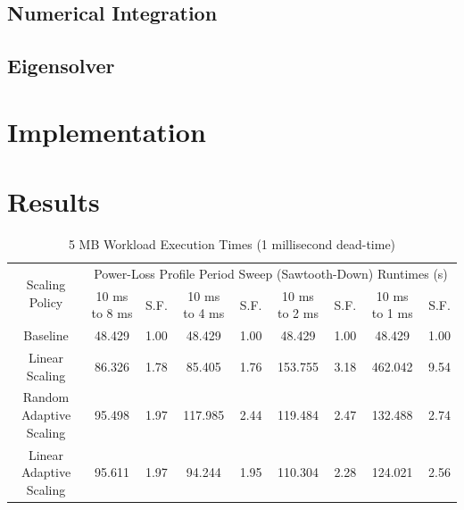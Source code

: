 \documentclass[journal, twoside]{IEEEtran}
\begin{document}
\subsection{Numerical Integration}

\lipsum[4]

\subsection{Eigensolver}

\lipsum[4]

\section{Implementation}

\lipsum[2]

\section{Results}

\lipsum[4]


\begin{table}
    \renewcommand{\arraystretch}{1.3} %
    \caption{5 MB Workload Execution Times (1 millisecond dead-time)}
    \label{main-workload-results-1ms}
    \centering
    \begin{tabular}{c||c|c|c|c|c|c|c|c}
        \hline
        \multirow{2}{*}{Scaling Policy} & \multicolumn{8}{c}{Power-Loss Profile Period Sweep (Sawtooth-Down) Runtimes (s)} \\\cline{2-9}
        {} & {10 ms to 8 ms} & {S.F.} & {10 ms to 4 ms} & {S.F.} & {10 ms to 2 ms} & {S.F.} & {10 ms to 1 ms} & {S.F.} \\
        \hline
        \hline
        {Baseline}                  & {48.429} & {1.00} & {48.429}  & {1.00} & {48.429}  & {1.00} & {48.429}  & {1.00}\\
        {Linear Scaling}            & {86.326} & {1.78} & {85.405}  & {1.76} & {153.755} & {3.18} & {462.042} & {9.54}\\
        {Random Adaptive Scaling}   & {95.498} & {1.97} & {117.985} & {2.44} & {119.484} & {2.47} & {132.488} & {2.74}\\
        {Linear Adaptive Scaling}   & {95.611} & {1.97} & {94.244}  & {1.95} & {110.304} & {2.28} & {124.021} & {2.56}\\
        \hline
    \end{tabular}
\end{table}
\end{document}
